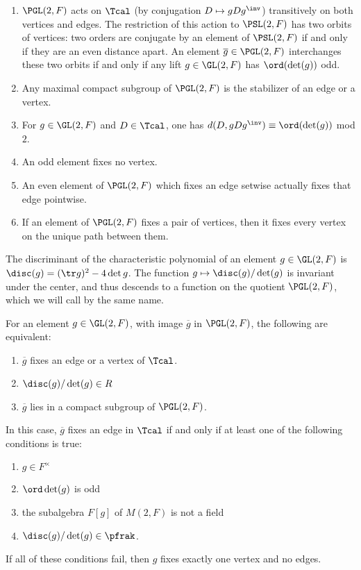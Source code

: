 \documentclass[draft]{amsart}
\begin{document}
\begin{proposition}
    \begin{enumerate}
        \item $\PGL(2,F)$ acts on $\Tcal$ (by conjugation $D\mapsto gDg^\inv$) transitively on both vertices and edges. The restriction of this action to $\PSL(2,F)$ has two orbits of vertices: two orders are conjugate by an element of $\PSL(2,F)$ if and only if they are an even distance apart. An element $\overline{g} \in \PGL(2,F)$ interchanges these two orbits if and only if any lift $g \in \GL(2,F)$ has $\ord(\det(g))$ odd.
        \item Any maximal compact subgroup of $\PGL(2,F)$ is the stabilizer of an edge or a vertex.
        \item For $g \in \GL(2,F)$ and $D\in \Tcal$, one has $d(D,g D g^\inv) \equiv \ord(\det (g))$ mod $2$.
        \item An odd element fixes no vertex.
        \item An even element of $\PGL(2,F)$ which fixes an edge setwise actually fixes that edge pointwise.
        \item If an element of $\PGL(2,F)$ fixes a pair of vertices, then it fixes every vertex on the unique path between them.
    \end{enumerate}
\end{proposition}

The discriminant of the characteristic polynomial of an element $g\in \GL(2,F)$ is $\disc(g) =(\tr g)^2 - 4 \det g$. The function $g \mapsto \disc(g)/\det(g)$ is invariant under the center, and thus descends to a function on the quotient $\PGL(2,F)$, which we will call by the same name.

\begin{proposition}
    For an element $g\in \GL(2,F)$, with image $\overline{g}$ in $\PGL(2,F)$, the following are equivalent:
    \begin{enumerate}
        \item $\overline{g}$ fixes an edge or a vertex of $\Tcal$.
        \item $\disc(g)/\det(g) \in R$
        \item $\overline{g}$ lies in a compact subgroup of $\PGL(2,F)$.
    \end{enumerate}
    In this case, $\overline{g}$ fixes an edge in $\Tcal$ if and only if at least one of the following conditions is true:
    \begin{enumerate}
        \item $g \in F^\times$
        \item $\ord \det (g)$ is odd
        \item the subalgebra $F[g]$ of $M(2,F)$ is not a field
        \item $\disc(g)/\det(g) \in \pfrak$.
    \end{enumerate}
    If all of these conditions fail, then $g$ fixes exactly one vertex and no edges.
\end{proposition}
\end{document}
